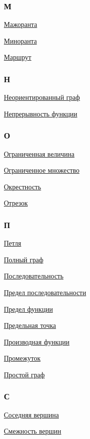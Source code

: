 \begin{multicols}{3}
\subsubsection*{М}
\hyperlink{def:majorant}{Мажоранта}

\hyperlink{def:minorant}{Миноранта}

\hyperlink{def:walk}{Маршрут}

\subsubsection*{Н}
\hyperlink{def:undirected_graph}{Неориентированный граф}

\hyperlink{def:continuity_of_function}{Непрерывность функции}

\subsubsection*{О}
\hyperlink{def:bounded_quantity}{Ограниченная величина}

\hyperlink{def:bounded_set}{Ограниченное множество}

\hyperlink{def:neighbourhood}{Окрестность}

\hyperlink{def:closed_interval}{Отрезок}

\subsubsection*{П}
\hyperlink{def:loop}{Петля}

\hyperlink{def:complete_graph}{Полный граф}

\hyperlink{def:sequence}{Последовательность}

\hyperlink{def:limit_of_sequence}{Предел последовательности}

\hyperlink{def:limit_of_function}{Предел функции}

\hyperlink{def:limit_point}{Предельная точка}

\hyperlink{def:derivative_of_function}{Производная функции}

\hyperlink{def:interval}{Промежуток}

\hyperlink{def:simple_graph}{Простой граф}

\subsubsection*{С}
\hyperlink{def:adjacency_of_vertexes}{Соседняя вершина}

\hyperlink{def:adjacency_of_vertexes}{Смежность вершин}


\end{multicols}
